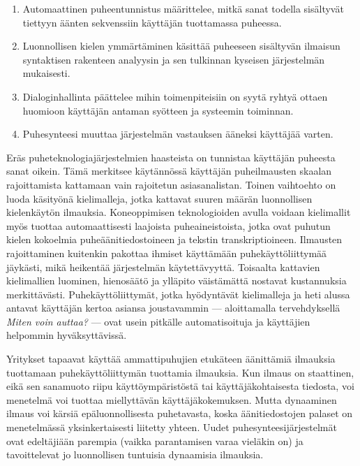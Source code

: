 \documentclass[]{../../metanetpaper}
\begin{document}
\begin{Parallel}[c]{77mm}{77mm}
{\begin{enumerate}
\item Automaattinen puheentunnistus määrittelee, mitkä sanat todella
    sisältyvät tiettyyn äänten sekvenssiin käyttäjän tuottamassa
    puheessa.

\item Luonnollisen kielen ymmärtäminen käsittää puheeseen sisältyvän
    ilmaisun syntaktisen rakenteen analyysin ja sen tulkinnan kyseisen
    järjestelmän mukaisesti.

\item Dialoginhallinta päättelee mihin toimenpiteisiin on syytä ryhtyä
    ottaen huomioon käyttäjän antaman syötteen ja systeemin toiminnan.

\item Puhesynteesi muuttaa järjestelmän vastauksen ääneksi käyttäjää
    varten.

\end{enumerate}
Eräs puheteknologiajärjestelmien haasteista on tunnistaa käyttäjän
puheesta sanat oikein. Tämä merkitsee käytännössä käyttäjän
puheilmausten skaalan rajoittamista kattamaan vain rajoitetun
asiasanalistan. Toinen vaihtoehto on luoda käsityönä kielimalleja,
jotka kattavat suuren määrän luonnollisen kielenkäytön
ilmauksia. Koneoppimisen teknologioiden avulla voidaan kielimallit
myös tuottaa automaattisesti laajoista puheaineistoista, jotka ovat
puhutun kielen kokoelmia puheäänitiedostoineen ja tekstin
transkriptioineen. Ilmausten rajoittaminen kuitenkin pakottaa ihmiset
käyttämään puhekäyttöliittymää jäykästi, mikä heikentää järjestelmän
käytettävyyttä. Toisaalta kattavien kielimallien luominen, hienosäätö
ja ylläpito väistämättä nostavat kustannuksia
merkittävästi. Puhekäyttöliittymät, jotka hyödyntävät kielimalleja ja
heti alussa antavat käyttäjän kertoa asiansa joustavammin —
aloittamalla tervehdyksellä \textit{Miten voin auttaa?} — ovat usein
pitkälle automatisoituja ja käyttäjien helpommin hyväksyttävissä.

Yritykset tapaavat käyttää ammattipuhujien etukäteen äänittämiä
ilmauksia tuottamaan puhekäyttöliittymän tuottamia ilmauksia. Kun
ilmaus on staattinen, eikä sen sanamuoto riipu käyttöympäristöstä tai
käyttäjäkohtaisesta tiedosta, voi menetelmä voi tuottaa miellyttävän
käyttäjäkokemuksen. Mutta dynaaminen ilmaus voi kärsiä
epäluonnollisesta puhetavasta, koska äänitiedostojen palaset on
menetelmässä yksinkertaisesti liitetty yhteen. Uudet
puhesynteesijärjestelmät ovat edeltäjiään parempia (vaikka
parantamisen varaa vieläkin on) ja tavoittelevat jo luonnollisen
tuntuisia dynaamisia ilmauksia.

}
\end{Parallel}
\end{document}

